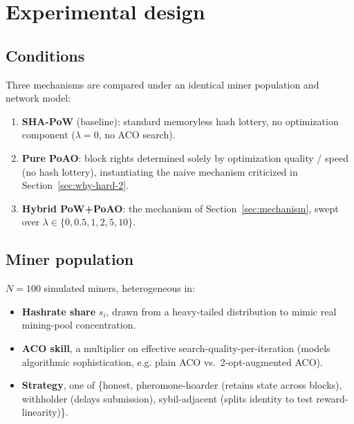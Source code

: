 \documentclass[journal]{IEEEtran}
\begin{document}
\section{Experimental design}
\label{sec:experiment}

\subsection{Conditions}
Three mechanisms are compared under an identical miner population and network
model:
\begin{enumerate}[nosep]
\item \textbf{SHA-PoW} (baseline): standard memoryless hash lottery, no
optimization component ($\lambda = 0$, no ACO search).
\item \textbf{Pure PoAO}: block rights determined solely by optimization
quality / speed (no hash lottery), instantiating the naive mechanism
criticized in Section~\ref{sec:why-hard-2}.
\item \textbf{Hybrid PoW+PoAO}: the mechanism of Section~\ref{sec:mechanism},
swept over $\lambda \in \{0, 0.5, 1, 2, 5, 10\}$.
\end{enumerate}

\subsection{Miner population}
$N = 100$ simulated miners, heterogeneous in:
\begin{itemize}[nosep]
\item \textbf{Hashrate share} $s_i$, drawn from a heavy-tailed distribution to
mimic real mining-pool concentration.
\item \textbf{ACO skill}, a multiplier on effective search-quality-per-iteration
(models algorithmic sophistication, e.g. plain ACO vs.\ 2-opt-augmented ACO).
\item \textbf{Strategy}, one of \{honest, pheromone-hoarder (retains state
across blocks), withholder (delays submission), sybil-adjacent (splits
identity to test reward-linearity)\}.
\end{itemize}
\end{document}
